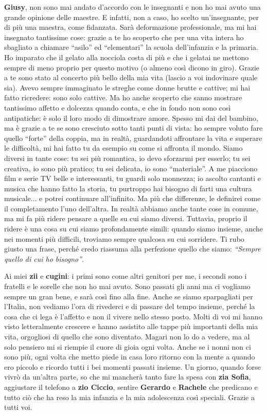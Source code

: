 \textbf{Giusy}, non sono mai andato d'accordo con le insegnanti e non ho mai avuto una grande opinione delle maestre. E infatti, non a caso, ho scelto un'insegnante, per di più una maestra, come fidanzata. Sarà deformazione professionale, ma mi hai insegnato tantissime cose: grazie a te ho scoperto che per una vita intera ho sbagliato a chiamare “asilo” ed “elementari” la scuola dell'infanzia e la primaria. Ho imparato che il gelato alla nocciola costa di più e che i gelatai ne mettono sempre di meno proprio per questo motivo (o almeno così dicono in giro). Grazie a te sono stato al concerto più bello della mia vita (lascio a voi indovinare quale sia). Avevo sempre immaginato le streghe come donne brutte e cattive; mi hai fatto ricredere: sono solo cattive. Ma ho anche scoperto che sanno mostrare tantissimo affetto e dolcezza quando conta, e che in fondo non sono così antipatiche: è solo il loro modo di dimostrare amore. Spesso mi dai del bambino, ma è grazie a te se sono cresciuto sotto tanti punti di vista: ho sempre voluto fare quello “forte” della coppia, ma in realtà, guardandoti affrontare la vita e superare le difficoltà, mi hai fatto tu da esempio su come si affronta il mondo.
Siamo diversi in tante cose: tu sei più romantica, io devo sforzarmi per esserlo; tu sei creativa, io sono più pratico; tu sei delicata, io sono “materiale”. A me piacciono film e serie TV belle e interessanti, tu guardi solo monnezza; io ascolto cantanti e musica che hanno fatto la storia, tu purtroppo hai bisogno di farti una cultura musicale... e potrei continuare all'infinito. Ma più che differenze, le definirei come il completamento l'uno dell'altra. In realtà abbiamo anche tante cose in comune, ma mi fa più ridere pensare a quelle su cui siamo diversi. Tuttavia, proprio il ridere è una cosa su cui siamo profondamente simili: quando siamo insieme, anche nei momenti più difficili, troviamo sempre qualcosa su cui sorridere. Ti rubo giusto una frase, perché credo riassuma alla perfezione quello che siamo: \textit{“Sempre quello di cui ho bisogno”}.

Ai miei \textbf{zii} e \textbf{cugini}: i primi sono come altri genitori per me, i secondi sono i fratelli e le sorelle che non ho mai avuto. Sono passati gli anni ma ci vogliamo sempre un gran bene, e sarà così fino alla fine. Anche se siamo sparpagliati per l'Italia, non vediamo l'ora di rivederci e di passare del tempo insieme, perché la cosa che ci lega è l'affetto e non il vivere nello stesso posto. Molti di voi mi hanno visto letteralmente crescere e hanno assistito alle tappe più importanti della mia vita, orgogliosi di quello che sono diventato. Magari non lo do a vedere, ma al solo pensiero mi si riempie il cuore di gioia ogni volta. Anche se i nonni non ci sono più, ogni volta che metto piede in casa loro ritorno con la mente a quando ero piccolo e ricordo tutti i bei momenti passati insieme. Un giorno, quando forse vivrò da un'altra parte, so che mi mancherà tanto fare la spesa con \textbf{zia Sofia}, aggiustare il telefono a \textbf{zio Ciccio}, sentire \textbf{Gerardo} e \textbf{Rachele} che predicano e tutto ciò che ha reso la mia infanzia e la mia adolescenza così speciali. Grazie a tutti voi.

